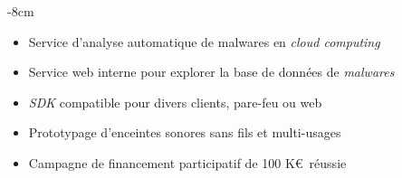 \documentclass[10pt,a4paper]{altacv}
\begin{document}

\begin{adjustwidth}{}{-8cm}
\makecvheader
\end{adjustwidth}


\begin{itemize}
\item Service d'analyse automatique de malwares en \textit{cloud computing}
\item Service web interne pour explorer la base de données de \textit{malwares}
\item \textit{SDK} compatible pour divers clients, pare-feu ou web
\end{itemize}

\divider

\begin{itemize}
\item Prototypage d'enceintes sonores sans fils et multi-usages
\item Campagne de financement participatif de 100 K\euro ~réussie
\end{itemize}

\divider
\end{document}
